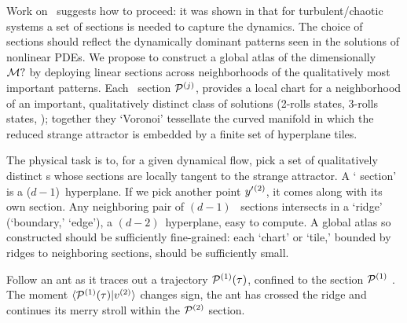 Work on \KS\ suggests how to proceed: it was shown in  that for turbulent/chaotic systems a set of {\Poincare} sections is needed to capture the dynamics. The choice of sections should reflect the dynamically dominant patterns seen in the solutions of nonlinear PDEs. We propose to construct a global atlas of the dimensionally \reducedsp\ ${\cal M}?$ by deploying linear {\Poincare} sections across neighborhoods of the qualitatively most important patterns. 
Each \Poincare\ section ${\cal P}{}^{(j)}$, provides a local chart for a neighborhood of an important, qualitatively distinct class of solutions (2-rolls states, 3-rolls states, \etc); together they `Voronoi' tessellate  the curved manifold in which the reduced strange attractor is embedded by a finite set of hyperplane tiles.

The physical task is to, for a given dynamical flow, pick a set of
qualitatively distinct {\template s} whose {\Poincare} sections are locally tangent
to the strange attractor. 
A `{\Poincare} section' is a
($d\!-\!1$)\dmn\ hyperplane. If we pick another {\template} point
${y'}{}^{(2)}$, it comes along with its own {\Poincare} section. Any
neighboring pair of $(d\!-\!1)$\dmn\ {\Poincare} sections intersects in a `ridge'
(`boundary,' `edge'), a $(d\!-\!2)$\dmn\ hyperplane, easy to compute.
A global atlas so constructed should be sufficiently
fine-grained: each `chart' or `tile,' bounded by ridges to
neighboring {\Poincare} sections, should be sufficiently small.

Follow an ant as it traces out a trajectory
${\cal P}{}^{(1)}(\tau)$, confined to the {\Poincare} section ${\cal P}{}^{(1)}$
. The
moment $\braket{\PoincS{}^{(1)}(\tau)}{\vel{}{}^{(2)}}$ changes
sign, the ant has crossed the ridge and  continues its merry stroll within the
${\cal P}{}^{(2)}$ {\Poincare} section.

